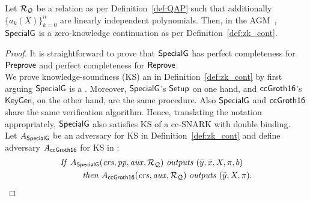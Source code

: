\begin{theorem}
\label{sec_specialg}
Let $\mathcal{R}_{\mathcal{Q}}$ be a relation as per Definition~\ref{def:QAP} such that additionally $\{a_k(X)\}_{k=0}^n$ are linearly independent polynomials. Then, in the 
AGM~\cite{Fuchs_AGM}, ${\mathsf{SpecialG}}$ is a zero-knowledge continuation as per Definition~\ref{def:zk_cont}. 
\end{theorem}
\begin{proof} It is straightforward to prove that ${\mathsf{SpecialG}}$ has perfect completeness for ${\mathsf{Preprove}}$ and perfect completeness 
for ${\mathsf{Reprove}}$. \\

\noindent We prove knowledge-soundness (KS) an in Definition~\ref{def:zk_cont} by first arguing ${\mathsf{SpecialG}}$ is a 
. 
 Moreover, 
${\mathsf{SpecialG}}$'s ${\mathsf{Setup}}$ on one hand, and ${\mathsf{ccGroth16}}$'s $ \mathsf{KeyGen} $, on the other hand, are the same procedure. Also ${\mathsf{SpecialG}}$ 
and ${\mathsf{ccGroth16}}$ share the same verification algorithm. Hence, translating the notation appropriately, ${\mathsf{SpecialG}}$ also satisfies KS 
of a cc-SNARK with double binding. \\

\noindent Let $A_{{\mathsf{SpecialG}}}$ be an adversary for KS in Definition~\ref{def:zk_cont} and 
define adversary $A_{{\mathsf{ccGroth16}}}$ for KS  in :
\begin{align*}
&\mathit{If} \ A_{\SpecialG} (\crs, \pp, \realaux, \relRQ)\ \mathit{outputs} \  (\bary, \barx, X, \pi, b) \\
&\ \ \ \ \ \ \ \ \mathit{then}\ A_{\ccgroth} (\crs, \realaux, \relRQ)\ \mathit{outputs} \ (\bary, X, \pi). 
\end{align*}


\end{proof}
